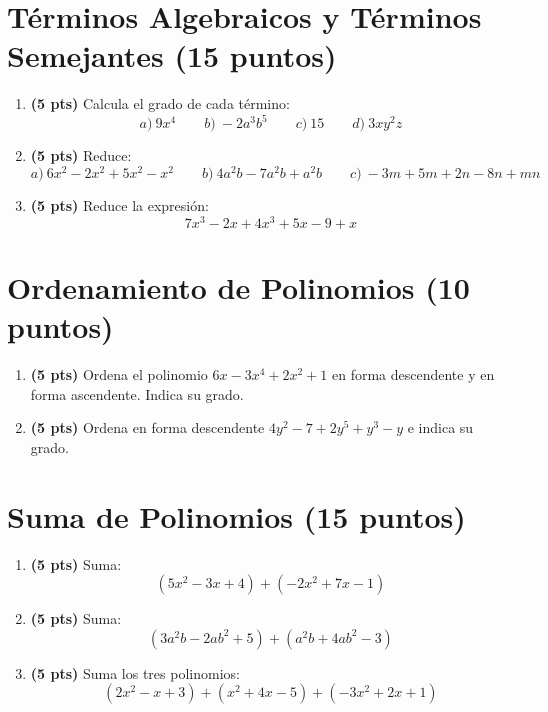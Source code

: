 \documentclass[12pt, letterpaper]{article}
\begin{document}
\newpage

\section{Términos Algebraicos y Términos Semejantes (15 puntos)}

\begin{enumerate}[leftmargin=*]
  \item \textbf{(5 pts)} Calcula el grado de cada término:
        \[
          a)\ 9x^4 \qquad b)\ -2a^3b^5 \qquad c)\ 15 \qquad d)\ 3xy^2z
        \]

  \item \textbf{(5 pts)} Reduce:
        \[
          a)\ 6x^2 - 2x^2 + 5x^2 - x^2 \qquad b)\ 4a^2b - 7a^2b + a^2b \qquad c)\ -3m + 5m + 2n - 8n + mn
        \]

  \item \textbf{(5 pts)} Reduce la expresión:
        \[
          7x^3 - 2x + 4x^3 + 5x - 9 + x
        \]
\end{enumerate}

\newpage

\section{Ordenamiento de Polinomios (10 puntos)}

\begin{enumerate}[leftmargin=*]
  \item \textbf{(5 pts)} Ordena el polinomio $6x - 3x^4 + 2x^2 + 1$ en forma descendente y en forma ascendente. Indica su grado.

  \item \textbf{(5 pts)} Ordena en forma descendente $4y^2 - 7 + 2y^5 + y^3 - y$ e indica su grado.
\end{enumerate}

\newpage

\section{Suma de Polinomios (15 puntos)}

\begin{enumerate}[leftmargin=*]
  \item \textbf{(5 pts)} Suma:
        \[
          (5x^2 - 3x + 4) + (-2x^2 + 7x - 1)
        \]

  \item \textbf{(5 pts)} Suma:
        \[
          (3a^2b - 2ab^2 + 5) + (a^2b + 4ab^2 - 3)
        \]

  \item \textbf{(5 pts)} Suma los tres polinomios:
        \[
          (2x^2 - x + 3) + (x^2 + 4x - 5) + (-3x^2 + 2x + 1)
        \]
\end{enumerate}
\end{document}

